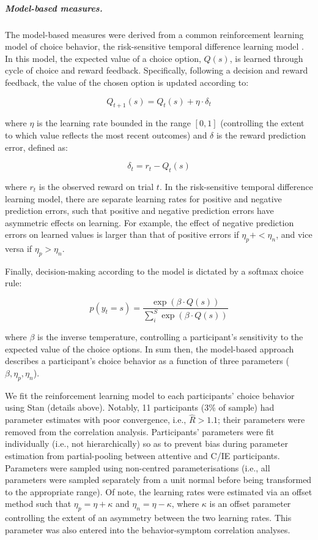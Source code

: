 \documentclass[a4paper,notitlepage,12pt]{article}
\begin{document}
\subparagraph{Model-based measures.} The model-based measures were derived from a common reinforcement learning model of choice behavior, the risk-sensitive temporal difference learning model \cite{niv2012neural}. In this model, the expected value of a choice option, $Q(s)$, is learned through cycle of choice and reward feedback. Specifically, following a decision and reward feedback, the value of the chosen option is updated according to:

\begin{equation*}
    Q_{t+1}(s) = Q_{t}(s) + \eta \cdot \delta_{t}
\end{equation*}

where $\eta$ is the learning rate bounded in the range $[0,1]$ (controlling the extent to which value reflects the most recent outcomes) and $\delta$ is the reward prediction error, defined as:

\begin{equation*}
    \delta_t = r_t - Q_{t}(s)
\end{equation*}

where $r_t$ is the observed reward on trial $t$. In the risk-sensitive temporal difference learning model, there are separate learning rates for positive and negative prediction errors, such that positive and negative prediction errors have asymmetric effects on learning. For example, the effect of negative prediction errors on learned values is larger than that of positive errors if $\eta_p+ < \eta_n$, and vice versa if $\eta_p > \eta_n$.

Finally, decision-making according to the model is dictated by a softmax choice rule:

\begin{equation*}
    p(y_t = s) = \frac{\exp \left( \beta \cdot Q(s) \right)}{\sum_i^S \exp \left( \beta \cdot Q(s) \right)}
\end{equation*}

where $\beta$ is the inverse temperature, controlling a participant's sensitivity to the expected value of the choice options. In sum then, the model-based approach describes a participant's choice behavior as a function of three parameters ($\beta, \eta_p, \eta_n$). 

We fit the reinforcement learning model to each participants' choice behavior using Stan (details above). Notably, 11 participants (3\% of sample) had parameter estimates with poor convergence, i.e., $\hat{R} > 1.1$; their parameters were removed from the correlation analysis. Participants' parameters were fit individually (i.e., not hierarchically) so as to prevent bias during parameter estimation from partial-pooling between attentive and C/IE participants. Parameters were sampled using non-centred parameterisations (i.e., all parameters were sampled separately from a unit normal before being transformed to the appropriate range). Of note, the learning rates were estimated via an offset method such that $\eta_p = \eta + \kappa$ and $\eta_n = \eta - \kappa$, where $\kappa$ is an offset parameter controlling the extent of an asymmetry between the two learning rates. This parameter was also entered into the behavior-symptom correlation analyses. 
\end{document}
